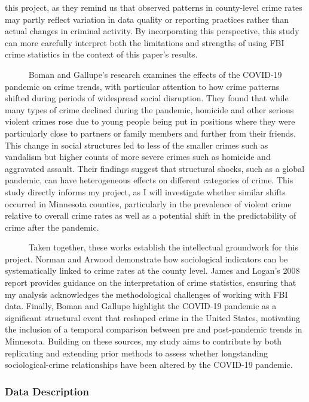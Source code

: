 \documentclass[
  11pt,
  letterpaper,
  DIV=11,
  numbers=noendperiod]{scrartcl}
\begin{document}
this project, as they remind us that observed patterns in county-level
crime rates may partly reflect variation in data quality or reporting
practices rather than actual changes in criminal activity. By
incorporating this perspective, this study can more carefully interpret
both the limitations and strengths of using FBI crime statistics in the
context of this paper's results.\\
\strut ~~~~~ Boman and Gallupe's research examines the effects of the
COVID-19 pandemic on crime trends, with particular attention to how
crime patterns shifted during periods of widespread social disruption.
They found that while many types of crime declined during the pandemic,
homicide and other serious violent crimes rose due to young people being
put in positions where they were particularly close to partners or
family members and further from their friends. This change in social
structures led to less of the smaller crimes such as vandalism but
higher counts of more severe crimes such as homicide and aggravated
assault. Their findings suggest that structural shocks, such as a global
pandemic, can have heterogeneous effects on different categories of
crime. This study directly informs my project, as I will investigate
whether similar shifts occurred in Minnesota counties, particularly in
the prevalence of violent crime relative to overall crime rates as well
as a potential shift in the predictability of crime after the
pandemic.\\
\strut ~~~~~ Taken together, these works establish the intellectual
groundwork for this project. Norman and Arwood demonstrate how
sociological indicators can be systematically linked to crime rates at
the county level. James and Logan's 2008 report provides guidance on the
interpretation of crime statistics, ensuring that my analysis
acknowledges the methodological challenges of working with FBI data.
Finally, Boman and Gallupe highlight the COVID-19 pandemic as a
significant structural event that reshaped crime in the United States,
motivating the inclusion of a temporal comparison between pre and
post-pandemic trends in Minnesota. Building on these sources, my study
aims to contribute by both replicating and extending prior methods to
assess whether longstanding sociological-crime relationships have been
altered by the COVID-19 pandemic.

\subsubsection{Data Description}\label{data-description}
\end{document}
